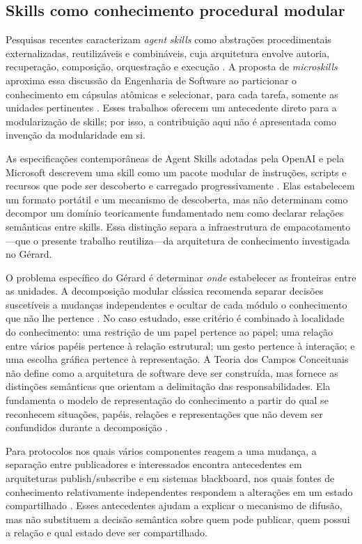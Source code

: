 \documentclass[preprint,12pt,authoryear]{elsarticle}
\newcommand{\gerard}{Gérard\xspace}
\begin{document}
\subsection{Skills como conhecimento procedural modular}

Pesquisas recentes caracterizam \emph{agent skills} como abstrações procedimentais externalizadas, reutilizáveis e combináveis, cuja arquitetura envolve autoria, recuperação, composição, orquestração e execução \citep{badhe2026survey}. A proposta de \emph{microskills} aproxima essa discussão da Engenharia de Software ao particionar o conhecimento em cápsulas atômicas e selecionar, para cada tarefa, somente as unidades pertinentes \citep{zare2026microskill}. Esses trabalhos oferecem um antecedente direto para a modularização de skills; por isso, a contribuição aqui não é apresentada como invenção da modularidade em si.

As especificações contemporâneas de Agent Skills adotadas pela OpenAI e pela Microsoft descrevem uma skill como um pacote modular de instruções, scripts e recursos que pode ser descoberto e carregado progressivamente \citep{openai2026skills,microsoft2026skills}. Elas estabelecem um formato portátil e um mecanismo de descoberta, mas não determinam como decompor um domínio teoricamente fundamentado nem como declarar relações semânticas entre skills. Essa distinção separa a infraestrutura de empacotamento---que o presente trabalho reutiliza---da arquitetura de conhecimento investigada no \gerard.

O problema específico do \gerard é determinar \emph{onde} estabelecer as fronteiras entre as unidades. A decomposição modular clássica recomenda separar decisões suscetíveis a mudanças independentes e ocultar de cada módulo o conhecimento que não lhe pertence \citep{parnas1972criteria}. No caso estudado, esse critério é combinado à localidade do conhecimento: uma restrição de um papel pertence ao papel; uma relação entre vários papéis pertence à relação estrutural; um gesto pertence à interação; e uma escolha gráfica pertence à representação. A Teoria dos Campos Conceituais não define como a arquitetura de software deve ser construída, mas fornece as distinções semânticas que orientam a delimitação das responsabilidades. Ela fundamenta o modelo de representação do conhecimento a partir do qual se reconhecem situações, papéis, relações e representações que não devem ser confundidos durante a decomposição \citep{vergnaud1998representation}.

Para protocolos nos quais vários componentes reagem a uma mudança, a separação entre publicadores e interessados encontra antecedentes em arquiteturas publish/subscribe \citep{eugster2003many} e em sistemas blackboard, nos quais fontes de conhecimento relativamente independentes respondem a alterações em um estado compartilhado \citep{nii1986blackboard}. Esses antecedentes ajudam a explicar o mecanismo de difusão, mas não substituem a decisão semântica sobre quem pode publicar, quem possui a relação e qual estado deve ser compartilhado.
\end{document}
